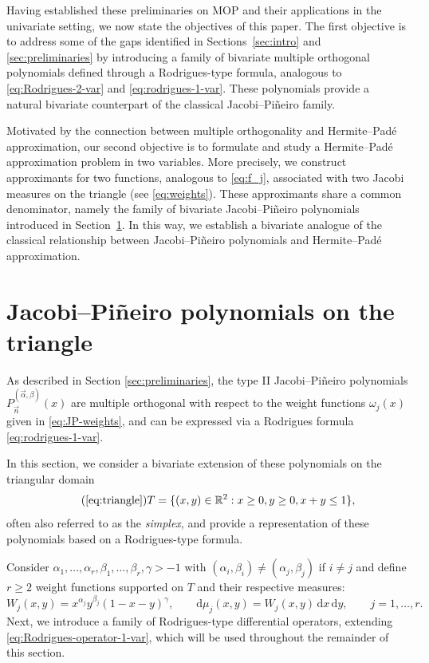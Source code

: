 \documentclass[11pt,reqno]{amsart}
\newcommand{\RR}{\mathbb{R}}
\newcommand{\dr}{\mathrm{d}}
\theoremstyle{definition}
\begin{document}
Having established these preliminaries on MOP and their applications in the univariate setting, we now state the objectives of this paper. The first objective is to address some of the gaps identified in Sections~\ref{sec:intro} and \ref{sec:preliminaries} by introducing a family of bivariate multiple orthogonal polynomials defined through a Rodrigues-type formula, analogous to \eqref{eq:Rodrigues-2-var} and \eqref{eq:rodrigues-1-var}. These polynomials provide a natural bivariate counterpart of the classical Jacobi--Piñeiro family.

Motivated by the connection between multiple orthogonality and Hermite--Padé approximation, our second objective is to formulate and study a Hermite--Padé approximation problem in two variables. More precisely, we construct approximants for two functions, analogous to \eqref{eq:f_j}, associated with two Jacobi measures on the triangle (see \eqref{eq:weights}). These approximants share a common denominator, namely the family of bivariate Jacobi--Piñeiro polynomials introduced in Section~\ref{sec:JP}. In this way, we establish a bivariate analogue of the classical relationship between Jacobi--Piñeiro polynomials and Hermite--Padé approximation.


\section{Jacobi--Piñeiro polynomials on the triangle}\label{sec:JP}

As described in Section \ref{sec:preliminaries}, the type II Jacobi--Piñeiro polynomials $P^{(\vec \alpha,\beta)}_{\vec n}(x)$ are multiple orthogonal with respect to the weight functions $\omega_j(x)$ given in \eqref{eq:JP-weights}, and can be expressed via a Rodrigues formula \eqref{eq:rodrigues-1-var}.

In this section, we consider a bivariate extension of these polynomials on the triangular domain 
\begin{equation}
\tag{\ref{eq:triangle}}
    T = \{(x,y)\in\RR^2: x\geq 0, y\geq 0, x+y \leq 1\},
\end{equation}
often also referred to as the \textit{simplex}, and provide a representation of these polynomials based on a Rodrigues-type formula. 


Consider $\alpha_1,\dots,\alpha_r,\beta_1,\dots,\beta_r,\gamma>-1$ with $(\alpha_i,\beta_i)\ne(\alpha_j,\beta_j)$ if $i\ne j$ and define $r\geq 2$ weight functions supported on $T$ and their respective measures: 
\begin{equation}
    \label{eq:weights}
    W_j(x,y) = x^{\alpha_j}y^{\beta_j}(1-x-y)^{\gamma}, \qquad \dr\mu_j(x,y)=W_j(x,y)\,\dr x\,\dr y, \qquad j=1,\dots,r.
\end{equation}
Next, we introduce a family of Rodrigues-type differential operators, extending \eqref{eq:Rodrigues-operator-1-var},  which will be used throughout the remainder of this section.
\end{document}
